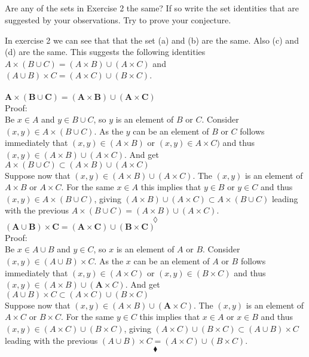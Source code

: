 \subsection{}
\begin{tcolorbox}
Are any of the sets in Exercise 2 the same? If so write the set identities that are suggested by your observations. Try to prove your conjecture.
\end{tcolorbox}
In exercise 2 we can see that that the set (a) and (b) are the same. Also (c) and (d) are the same. This suggests the following identities $A\times (B\cup C)=(A\times B)\cup(A\times C)$ and $(A\cup B)\times C=(A\times C)\cup(B\times C)$. \\\\
$\mathbf{A\times (B\cup C)=(A\times B)\cup(A\times C)}$\\
Proof:\\
Be $x\in A$ and $ y\in B\cup C$, so $y$ is an element of $B$ or $C$. Consider $(x,y)\in A\times (B\cup C)$. As the $y$ can be an element of $B$ or $C$  follows immediately that $(x,y)\in (A\times B)$ or $(x,y)\in A\times C)$ and thus  $(x,y)\in (A\times B)\cup(A\times C)$. And get $A\times (B\cup C)\subset(A\times B)\cup(A\times C)$ \\
Suppose now that $(x,y)\in (A\times B)\cup(A\times C)$. The $(x,y)$ is an element of $A\times B$ or $A\times C$. For the same $x\in A$ this implies that $y\in B$ or $y\in C$ and thus $(x,y) \in A\times (B\cup C)$, giving $(A\times B)\cup(A\times C)\subset A\times (B\cup C)$ leading with the previous  $A\times (B\cup C)=(A\times B)\cup(A\times C)$.
$$\lozenge$$
$\mathbf{(A\cup B)\times C=(A\times C)\cup(B\times C)}$\\
Proof:\\
Be $x\in A\cup B $ and $ y\in  C$, so $x$ is an element of $A$ or $B$. Consider $(x,y)\in(A\cup B)\times C$. As the $x$ can be an element of $A$ or $B$  follows immediately that $(x,y)\in (A\times C)$ or $(x,y)\in (B\times C)$ and thus  $(x,y)\in (A\times B)\cup(\textbf{A}\times C)$. And get $(A\cup B)\times C\subset(A\times C)\cup(B\times C)$ \\
Suppose now that $(x,y)\in (A\times B)\cup(\textbf{A}\times C)$. The $(x,y)$ is an element of $A\times C$ or $B\times C$. For the same $y\in C$ this implies that $x\in A$ or $x\in B$ and thus $(x,y) \in (A\times C)\cup(B\times C)$, giving $(A\times C)\cup(B\times C)\subset (A\cup B)\times C$ leading with the previous  $(A\cup B)\times C=(A\times C)\cup(B\times C)$.
$$\blacklozenge$$

